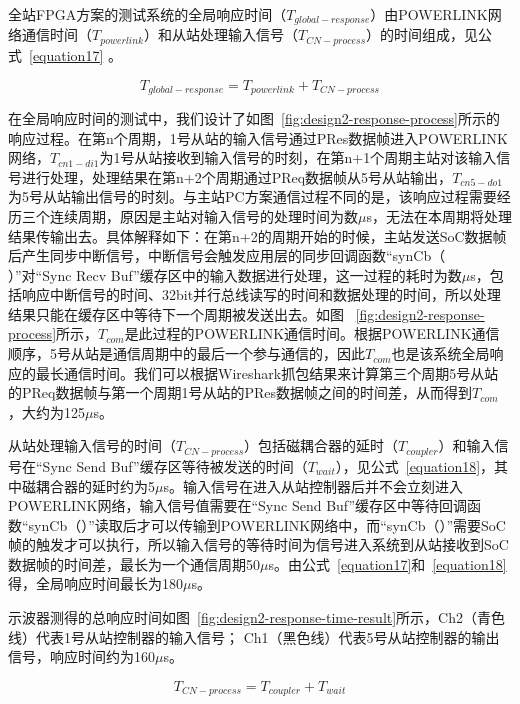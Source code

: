 全站FPGA方案的测试系统的全局响应时间（$T_{global-response}$）由POWERLINK网络通信时间（$T_{powerlink}$）和从站处理输入信号（$T_{CN-process}$）的时间组成，见公式~\ref{equation17} 。

\begin{equation}
\label{equation17}
T_{global-response}=T_{powerlink}+T_{CN-process}
\end{equation}

在全局响应时间的测试中，我们设计了如图~\ref{fig:design2-response-process}所示的响应过程。在第n个周期，1号从站的输入信号通过PRes数据帧进入POWERLINK网络，$T_{cn1-di1}$为1号从站接收到输入信号的时刻，在第n+1个周期主站对该输入信号进行处理，处理结果在第n+2个周期通过PReq数据帧从5号从站输出，$T_{cn5-do1}$为5号从站输出信号的时刻。与主站PC方案通信过程不同的是，该响应过程需要经历三个连续周期，原因是主站对输入信号的处理时间为数$\mu$s，无法在本周期将处理结果传输出去。具体解释如下：在第n+2的周期开始的时候，主站发送SoC数据帧后产生同步中断信号，中断信号会触发应用层的同步回调函数“synCb（ ）”对“Sync Recv Buf”缓存区中的输入数据进行处理，这一过程的耗时为数$\mu$s，包括响应中断信号的时间、32bit并行总线读写的时间和数据处理的时间，所以处理结果只能在缓存区中等待下一个周期被发送出去。如图 ~\ref{fig:design2-response-process}所示，$T_{com}$是此过程的POWERLINK通信时间。根据POWERLINK通信顺序，5号从站是通信周期中的最后一个参与通信的，因此$T_{com}$也是该系统全局响应的最长通信时间。我们可以根据Wireshark抓包结果来计算第三个周期5号从站的PReq数据帧与第一个周期1号从站的PRes数据帧之间的时间差，从而得到$T_{com}$，大约为125$\mu$s。

从站处理输入信号的时间（$T_{CN-process}$）包括磁耦合器的延时（$T_{coupler}$）和输入信号在“Sync Send Buf”缓存区等待被发送的时间（$T_{wait}$），见公式~\ref{equation18}，其中磁耦合器的延时约为5$\mu$s。输入信号在进入从站控制器后并不会立刻进入POWERLINK网络，输入信号值需要在“Sync Send Buf”缓存区中等待回调函数“synCb（）”读取后才可以传输到POWERLINK网络中，而“synCb（）”需要SoC帧的触发才可以执行，所以输入信号的等待时间为信号进入系统到从站接收到SoC数据帧的时间差，最长为一个通信周期50$\mu$s。由公式~\ref{equation17}和~\ref{equation18}得，全局响应时间最长为180$\mu$s。

示波器测得的总响应时间如图~\ref{fig:design2-response-time-result}所示，Ch2（青色线）代表1号从站控制器的输入信号； Ch1（黑色线）代表5号从站控制器的输出信号，响应时间约为160$\mu$s。


\begin{equation}
\label{equation18}
T_{CN-process}=T_{coupler}+T_{wait}
\end{equation}

